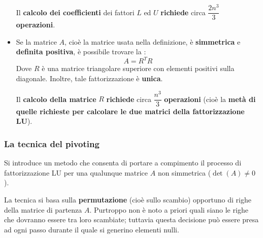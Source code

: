 \begin{itemize}
    Il \textbf{calcolo dei coefficienti} dei fattori $L$ ed $U$ \textbf{richiede} circa $\dfrac{2n^{3}}{3}$ \textbf{operazioni}.
    

    \item Se la matrice $A$, cioè la matrice usata nella definizione, è \textbf{simmetrica} e \textbf{definita positiva}, è possibile trovare la :
    \begin{equation}\label{eq: fattorizzazione di Cholesky}
        A = R^{T}R
    \end{equation}
    Dove $R$ è una matrice triangolare superiore con elementi positivi sulla diagonale. Inoltre, tale fattorizzazione è \textbf{unica}.

    Il \textbf{calcolo della matrice} $R$ \textbf{richiede} circa $\dfrac{n^{3}}{3}$ \textbf{operazioni} (cioè la \textbf{metà di quelle richieste per calcolare le due matrici della fattorizzazione LU}).
\end{itemize}

\longline

\subsubsection{La tecnica del pivoting}\label{subsubsection: La tecnica del pivoting}

Si introduce un metodo che consenta di portare a compimento il processo di fattorizzazione LU per una qualunque matrice $A$ non simmetrica ($\det(A) \ne 0$). 

\highspace
La tecnica si basa sulla \textbf{permutazione} (cioè sullo scambio) opportuno di righe della matrice di partenza $A$. Purtroppo non è noto a priori quali siano le righe che dovranno essere tra loro scambiate; tuttavia questa decisione può essere presa ad ogni passo durante il quale si generino elementi nulli.

